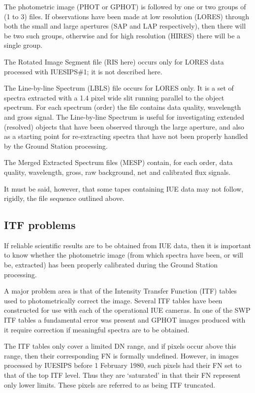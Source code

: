 The photometric image (PHOT or GPHOT) is followed by one or two groups of
(1 to 3) files.  If observations have been made at low resolution (LORES)
through both the small and large apertures (SAP and LAP respectively), then
there will be two such groups, otherwise and for high resolution (HIRES) there
will be a single group.

The Rotated Image Segment file (RIS here) occurs only for LORES data
processed with IUESIPS\#1; it is not described here.

The Line-by-line Spectrum (LBLS) file occurs for LORES only.  It is a set
of spectra extracted with a 1.4 pixel wide slit running parallel to the
object spectrum.  For each spectrum (order) the file contains data quality,
wavelength and gross signal.  The Line-by-line Spectrum is useful for
investigating extended (resolved) objects that have been observed through
the large aperture, and also as a starting point for re-extracting spectra that
have not been properly handled by the Ground Station processing.

The Merged Extracted Spectrum files (MESP) contain, for each order, data
quality, wavelength, gross, raw background, net and calibrated flux
signals.

It must be said, however, that some tapes containing IUE data may not follow,
rigidly, the file sequence outlined above.

\subsection{\label{subse:itf_prob}ITF problems}

If reliable scientific results are to be obtained from IUE data, then it is
important to know whether the photometric image (from which spectra have
been, or will be, extracted) has been properly calibrated during the Ground
Station processing.

A major problem area is that of the Intensity Transfer Function (ITF) tables
used to photometrically correct the image.  Several ITF tables have been
constructed for use with each of the operational IUE cameras.  In one of the
SWP ITF tables a fundamental error was present and GPHOT images produced with
it require correction if meaningful spectra are to be obtained.

The ITF tables only cover a limited DN range, and if pixels occur above this
range, then their corresponding FN is formally undefined.  However, in images
processed by IUESIPS before 1 February 1980, such pixels had their FN set
to that of the top ITF level.  Thus they are `saturated' in that their FN
represent only lower limits.  These pixels are referred to as being ITF
truncated.

